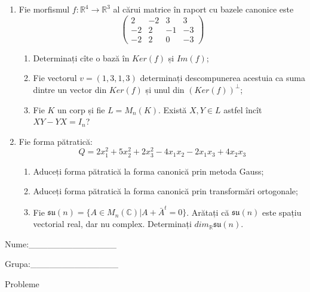 \documentclass{article}
\begin{document}
\begin{enumerate}
 \item Fie morfismul $f:\mathbb{R}^4 \to \mathbb{R}^3$ al cărui matrice în raport cu bazele canonice este
$$\begin{pmatrix}
2&-2&3&3\\
-2&2&-1&-3\\
-2&2&0&-3
\end{pmatrix}$$

\begin{enumerate}
\item Determinați cîte o bază în $Ker(f)$ și $Im(f)$;
\item Fie vectorul $v=(1,3,1,3)$ determinați descompunerea acestuia ca suma dintre un vector din $Ker(f)$ și unul din $(Ker(f))^\perp$;
\item Fie $K$ un corp și fie $L=M_n(K)$. Există $X,Y \in L$ astfel încît $XY-YX=I_n$?  
\end{enumerate}
\item Fie forma pătratică:
$$Q= 2x_1^2+5x_2^2+2x_3^2-4x_1x_2-2x_1x_3+4x_2x_3$$

\begin{enumerate}
\item Aduceți forma pătratică la forma canonică prin metoda Gauss;
\item Aduceți forma pătratică la forma canonică prin transformări ortogonale;
\item Fie $\mathfrak{su}(n)=\{ A \in M_n(\mathbb{C}) | A+\bar{A}^t=0\}$. Arătați că $\mathfrak{su}(n)$ este spațiu vectorial real, dar nu complex.
Determinați $dim_{\mathbb{R}}\mathfrak{su}(n)$.
\end{enumerate}
\end{enumerate}
\newpage
\begin{flushright}
Nume:\_\_\_\_\_\_\_\_\_\_\_\_\_\_
 
 
Grupa:\_\_\_\_\_\_\_\_\_\_\_\_\_\_
\end{flushright}
\begin{center}
\vspace{2cm}
{\Large Probleme}
\vspace{2cm}
\end{center}
\end{document}
